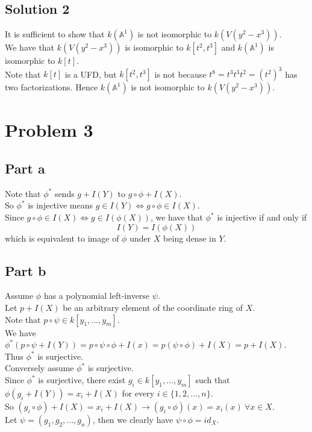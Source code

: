 \documentclass[12pt]{article}
\begin{document}
\subsection*{Solution 2}
It is sufficient to show that $k(\mathbb{A}^1)$ is not isomorphic to $k(V(y^2-x^3))$.\\
We have that $k(V(y^2-x^3))$ is isomorphic to $k[t^2,t^3]$ and $k(\mathbb{A}^1)$ is isomorphic to $k[t]$. \\
Note that $k[t]$ is a UFD, but $k[t^2,t^3]$ is not because $t^8=t^3t^3t^2=(t^2)^3$ has two factorizations.
Hence $k(\mathbb{A}^1)$ is not isomorphic to $k(V(y^2-x^3))$.


\clearpage
\section*{Problem 3}
\subsection*{Part a}
Note that $\phi^*$ sends $g+I(Y)$ to $g \circ \phi
+I(X)$.\\ 
So $\phi^*$ is injective means
$g \in I(Y) \Longleftrightarrow g \circ \phi \in I(X)$. \\
Since $g \circ \phi \in I(X) \Longleftrightarrow
g \in I(\phi(X))$, we have that
$\phi^{*}$ is injective if and only if
$$I(Y)=I(\phi(X))$$
which is equivalent to image of $\phi$ under $X$ being dense in $Y$.
\subsection*{Part b}
Assume $\phi$ has a polynomial left-inverse $\psi$. \\
Let $p+I(X)$ be an arbitrary element of the coordinate ring of $X$. \\
Note that $p \circ \psi \in k[y_1,...,y_m]$. \\
We have $\phi^* (p \circ \psi +I(Y)) =
p \circ \psi \circ \phi +I(x) =
p(\psi \circ \phi) +I(X) =p+I(X)$.\\ 
Thus $\phi^*$ is surjective. \\
Conversely assume $\phi^*$ is surjective. \\
Since $\phi^*$ is surjective, there exist $g_i \in k[y_1,...,y_m]$ such that 
$\phi (g_i + I(Y)) = x_i + I(X)$ for every $i \in \{1,2,...,n\}$. \\
So $(g_i \circ \phi) +I(X)=x_i +I(X) \rightarrow (g_i \circ \phi)(x)=x_i(x) \ \forall x \in X$.\\
Let $\psi = (g_1,g_2,...,g_n)$, then we clearly have
$\psi \circ \phi = id_{X}$.
\end{document}
